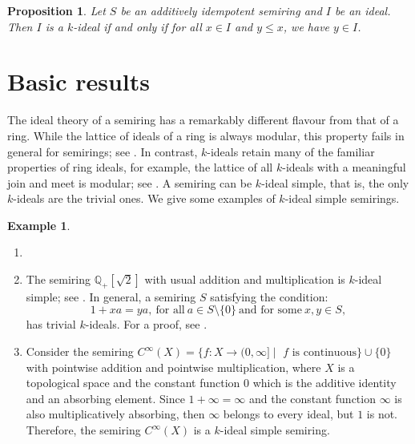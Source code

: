 \documentclass[11pt,english]{amsart}
\newtheorem{proposition}[theorem]{Proposition}
\theoremstyle{definition}
\newtheorem{example}[theorem]{Example}
\numberwithin{equation}{section}
\begin{document}
\begin{proposition}
    Let $S$ be an additively idempotent semiring and $I$ be an ideal. Then $I$ is a $k$-ideal if and only if for all $x\in I$ and $y\leqslant x$, we have $y\in I$.
\end{proposition}

\smallskip
\section{Basic results}\label{Section 3: Some results on k-ideals on semirings}
 
The ideal theory of a semiring has a remarkably different flavour from that of a ring. While the lattice of ideals of a ring is always modular, this property fails in general for semirings; see \cite[Example 6.36]{Golan}. In contrast, $k$-ideals retain many of the familiar properties of ring ideals, for example, the lattice of all $k$-ideals with a meaningful join and meet is modular; see \cite[Theorem 2.4]{SenAdhikari92}. A semiring can be $k$-ideal simple, that is, the only $k$-ideals are the trivial ones. We give some examples of $k$-ideal simple semirings. 

\begin{example}
\begin{enumerate}
    \item[]
        \item The semiring $\mathds{Q}_+[\sqrt{2}]$ with usual addition and multiplication is $k$-ideal simple; see \cite[Section 5.2]{BiswasGoswamiSardar}. In general, a semiring $S$ satisfying the condition:
        \[
        1+xa=ya,\ \text{for all}\ a\in S\setminus\{0\}\ \text{and for some}\ x,y\in S,
        \] has trivial $k$-ideals. For a proof, see \cite[Corollary 2.8]{SenAdhikari93}.
        
        \item  Consider the semiring $C^\infty(X)=\{f\colon X\rightarrow (0, \infty]\mid $  $f$ $ \text{is continuous}\}\cup \{0\}$ with pointwise addition and pointwise multiplication, where $X$ is a topological space and the constant function $0$ which is the additive identity and an absorbing element.  Since $1+\infty=\infty$ and the constant function $\infty$ is also multiplicatively absorbing,  then $\infty$ belongs to every ideal, but $1$ is not. Therefore, the semiring $C^\infty(X)$ is a $k$-ideal simple semiring. 
    \end{enumerate}
\end{example}
\end{document}
